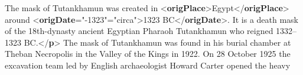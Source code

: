 \begin{shaded}
\hspace*{1em}\hspace*{1em}\mbox{}\newline 
\hspace*{1em}\hspace*{1em}\hspace*{1em}The mask of Tutankhamun was created in {<\textbf{origPlace}>}Egypt{</\textbf{origPlace}>} around {<\textbf{origDate}\hspace*{1em}{when}="{-1323}"\hspace*{1em}{type}="{circa}">}1323 BC{</\textbf{origDate}>}. It is a death mask of the 18th-dynasty ancient Egyptian Pharaoh Tutankhamun\mbox{}\newline 
\hspace*{1em}\hspace*{1em}\hspace*{1em}\hspace*{1em}\hspace*{1em}\hspace*{1em}\hspace*{1em}\hspace*{1em} who reigned 1332–1323 BC.{</\textbf{p}>}\mbox{}\newline 
\hspace*{1em}\hspace*{1em}\mbox{}\newline 
\hspace*{1em}\hspace*{1em}\mbox{}\newline 
\hspace*{1em}\hspace*{1em}\hspace*{1em}The mask of Tutankhamun was found in his burial chamber at Theban Necropolis in the Valley of the Kings in\mbox{}\newline 
\hspace*{1em}\hspace*{1em}\hspace*{1em}\hspace*{1em}\hspace*{1em}\hspace*{1em}\hspace*{1em}\hspace*{1em} 1922. On 28 October 1925 the excavation team led by English archaeologist Howard Carter opened the heavy\mbox{}\newline 

\end{shaded}
